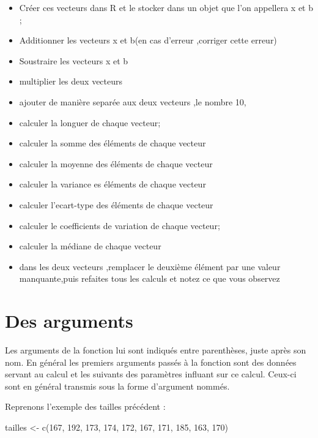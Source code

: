 \documentclass[
]{book}
\newenvironment{Shaded}{\begin{snugshade}}{\end{snugshade}}
\newcommand{\DecValTok}[1]{\textcolor[rgb]{0.00,0.00,0.81}{#1}}
\newcommand{\FunctionTok}[1]{\textcolor[rgb]{0.00,0.00,0.00}{#1}}
\newcommand{\NormalTok}[1]{#1}
\newcommand{\OtherTok}[1]{\textcolor[rgb]{0.56,0.35,0.01}{#1}}
\providecommand{\tightlist}{%
  \setlength{\itemsep}{0pt}\setlength{\parskip}{0pt}}
\begin{document}
\begin{itemize}
\tightlist
\item
  Créer ces vecteurs dans R et le stocker dans un objet que l'on appellera x et b ;
\item
  Additionner les vecteurs x et b(en cas d'erreur ,corriger cette erreur)
\item
  Soustraire les vecteurs x et b
\item
  multiplier les deux vecteurs
\item
  ajouter de manière separée aux deux vecteurs ,le nombre 10,
\item
  calculer la longuer de chaque vecteur;
\item
  calculer la somme des éléments de chaque vecteur
\item
  calculer la moyenne des éléments de chaque vecteur
\item
  calculer la variance es éléments de chaque vecteur
\item
  calculer l'ecart-type des éléments de chaque vecteur
\item
  calculer le coefficients de variation de chaque vecteur;
\item
  calculer la médiane de chaque vecteur
\item
  dans les deux vecteurs ,remplacer le deuxième élément par une valeur manquante,puis refaites tous les calculs et notez ce que vous observez
\end{itemize}

\hypertarget{des-arguments}{%
\section{Des arguments}\label{des-arguments}}

Les arguments de la fonction lui sont indiqués entre parenthèses, juste après son nom. En général les premiers arguments passés à la fonction sont des données servant au calcul et les suivants des paramètres influant sur ce calcul. Ceux-ci sont en général transmis sous la forme d'argument nommés.

Reprenons l'exemple des tailles précédent :

\begin{Shaded}
\begin{Highlighting}[]
\NormalTok{tailles }\OtherTok{\textless{}{-}} \FunctionTok{c}\NormalTok{(}\DecValTok{167}\NormalTok{, }\DecValTok{192}\NormalTok{, }\DecValTok{173}\NormalTok{, }\DecValTok{174}\NormalTok{, }\DecValTok{172}\NormalTok{, }\DecValTok{167}\NormalTok{, }\DecValTok{171}\NormalTok{, }\DecValTok{185}\NormalTok{, }\DecValTok{163}\NormalTok{, }\DecValTok{170}\NormalTok{)}
\end{Highlighting}
\end{Shaded}
\end{document}
